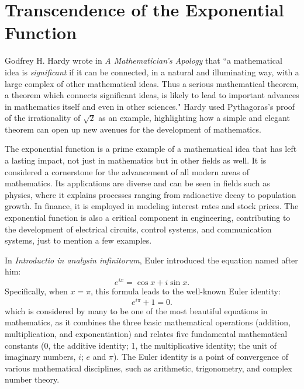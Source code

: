 \section{Transcendence of the Exponential Function}

Godfrey H. Hardy wrote in \emph{A Mathematician's Apology} that ``a mathematical idea is \emph{significant} if it can be connected, in a natural and illuminating way, with a large complex of other mathematical ideas. Thus a serious mathematical theorem, a theorem which connects significant ideas, is likely to lead to important advances in mathematics itself and even in other sciences." Hardy used Pythagoras's proof of the irrationality of $\sqrt{2}$ as an example, highlighting how a simple and elegant theorem can open up new avenues for the development of mathematics. 

The exponential function is a prime example of a mathematical idea that has left a lasting impact, not just in mathematics but in other fields as well. It is considered a cornerstone for the advancement of all modern areas of mathematics. Its applications are diverse and can be seen in fields such as physics, where it explains processes ranging from radioactive decay to population growth. In finance, it is employed in modeling interest rates and stock prices. The exponential function is also a critical component in engineering, contributing to the development of electrical circuits, control systems, and communication systems, just to mention a few examples.

In \emph{Introductio in analysin infinitorum}, Euler introduced the equation named after him:
\begin{equation*}
    e^{ix} =  \cos{x} + i \sin{x}.
\end{equation*}
Specifically, when $x=\pi$, this formula leads to the well-known Euler identity:
\begin{equation*}
    e^{i\pi} + 1 = 0.
\end{equation*}
which is considered by many to be one of the most beautiful equations in mathematics, as it combines the three basic mathematical operations (addition, multiplication, and exponentiation) and relates five fundamental mathematical constants (0, the additive identity; 1, the multiplicative identity; the unit of imaginary numbers, $i$; $e$ and $\pi$). The Euler identity is a point of convergence of various mathematical disciplines, such as arithmetic, trigonometry, and complex number theory.

